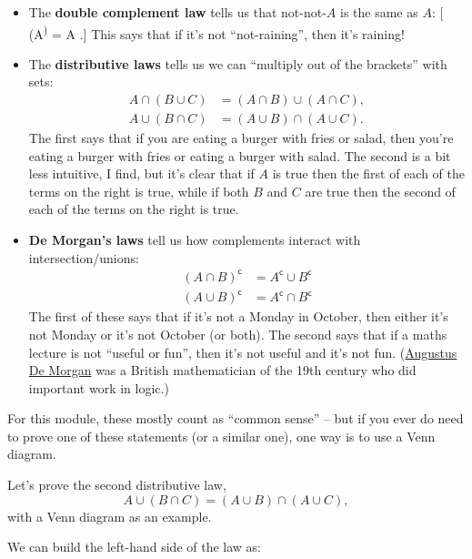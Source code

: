 \documentclass[
  letterpaper,
]{report}
\providecommand{\tightlist}{%
  \setlength{\itemsep}{0pt}\setlength{\parskip}{0pt}}\usepackage{longtable,booktabs,array}
\theoremstyle{definition}
\theoremstyle{definition}
\theoremstyle{remark}
\begin{document}
\begin{itemize}
\tightlist
\item
  The \textbf{double complement law} tells us that not-not-\(A\) is the
  same as \(A\): {[} (A\textsuperscript{)} = A .{]}
  This says that if it's not ``not-raining'', then it's raining!
\item
  The \textbf{distributive laws} tells us we can ``multiply out of the
  brackets'' with sets: \begin{align*}
  A \cap (B \cup C) &= (A \cap B) \cup (A \cap C) ,\\
  A \cup (B \cap C) &= (A \cup B) \cap (A \cup C) .
  \end{align*} The first says that if you are eating a burger with fries
  or salad, then you're eating a burger with fries or eating a burger
  with salad. The second is a bit less intuitive, I find, but it's clear
  that if \(A\) is true then the first of each of the terms on the right
  is true, while if both \(B\) and \(C\) are true then the second of
  each of the terms on the right is true.
\item
  \textbf{De Morgan's laws} tell us how complements interact with
  intersection/unions: \begin{align*}
  (A \cap B)^\mathsf{c}&= A^\mathsf{c}\cup B^\mathsf{c}\\
  (A \cup B)^\mathsf{c}&= A^\mathsf{c}\cap B^\mathsf{c}
  \end{align*} The first of these says that if it's not a Monday in
  October, then either it's not Monday or it's not October (or both).
  The second says that if a maths lecture is not ``useful or fun'', then
  it's not useful and it's not fun.
  (\href{https://mathshistory.st-andrews.ac.uk/Biographies/De_Morgan/}{Augustus
  De Morgan} was a British mathematician of the 19th century who did
  important work in logic.)
\end{itemize}

For this module, these mostly count as ``common sense'' -- but if you
ever do need to prove one of these statements (or a similar one), one
way is to use a Venn diagram.

Let's prove the second distributive law,
\[   A \cup (B \cap C) = (A \cup B) \cap (A \cup C) , \] with a Venn
diagram as an example.

We can build the left-hand side of the law as:
\end{document}

